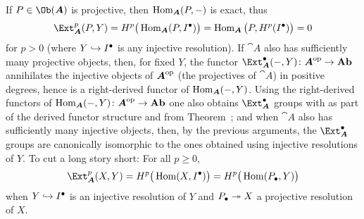 \documentclass[a4paper,parskip=half,numbers=enddot, DIV=12]{scrreprt}
\renewcommand{\geq}{\geqslant}
\begin{document}
If $P\in\Ob({\cat A})$ is projective, then $\Hom_{\cat A}(P,-)$ is exact, thus
\begin{align*}
	\Ext_{\cat A}^p(P,Y)=H^p\big(\Hom_{\cat A}(P,I^\bullet)\big)=\Hom_{\cat A}\big(P,H^p(I^\bullet)\big)=0
\end{align*}
for $p>0$ (where $Y\monomorphism I^\bullet$ is any injective resolution). If ${\cat A}$ also has sufficiently many projective objects, then, for fixed $Y$, the functor $\Ext_{\cat A}^\bullet(-,Y)\colon {\cat A}^\op\morphism\cat{Ab}$ annihilates the injective objects of ${\cat A}^\op$ (the projectives of ${\cat A}$) in positive degrees, hence is a right-derived functor of $\Hom_{\cat A}(-,Y)$. Using the right-derived functors of $\Hom_{\cat A}(-,Y)\colon {\cat A} ^\op\morphism\cat{Ab}$ one also obtains $\Ext_{\cat A}^\bullet$ groups with  as part of the derived functor structure and  from Theorem~; and when ${\cat A}$ also has sufficiently many injective objects, then, by the previous arguments, the $\Ext_{\cat A}^\bullet$ groups are canonically isomorphic to the ones obtained using injective resolutions of $Y$. To cut a long story short: For all $p\geq 0$,
\begin{align*}
	\Ext_{\cat A}^p(X,Y)=H^p\big(\Hom(X,I^\bullet)\big)=H^p\big(\Hom(P_\bullet,Y)\big)
\end{align*}
when $Y\monomorphism I^\bullet$ is an injective resolution of $Y$ and $P_\bullet\epimorphism X$ a projective resolution of $X$.
\end{document}
